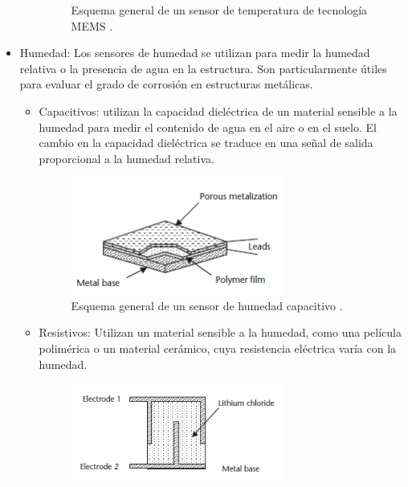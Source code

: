 \begin{itemize}
\begin{itemize}
\begin{figure}[H]
                \caption{Esquema general de un sensor de temperatura de tecnología MEMS \citep{dunn2005introduction}.}
                \label{fig:temp-MEMS}
            \end{figure}
        \end{itemize}

        \item Humedad: Los sensores de humedad se utilizan para medir la humedad relativa o la presencia de agua en la estructura. Son particularmente útiles para evaluar el grado de corrosión en estructuras metálicas.
        \begin{itemize}
            \item Capacitivos: utilizan la capacidad dieléctrica de un material sensible a la humedad para medir el contenido de agua en el aire o en el suelo. El cambio en la capacidad dieléctrica se traduce en una señal de salida proporcional a la humedad relativa.
            \begin{figure}[H]
                \centering
                \includegraphics[width = 0.7\textwidth]{imagenes/cap1_marcoteo/HigrometroCapacitivo.png}
                \caption{Esquema general de un sensor de humedad capacitivo \citep{dunn2005introduction}.}
                \label{fig:hig-cap}
            \end{figure}
            \item Resistivos: Utilizan un material sensible a la humedad, como una película polimérica o un material cerámico, cuya resistencia eléctrica varía con la humedad.
            \begin{figure}[H]
                \centering
                \includegraphics[width = 0.7\textwidth]{imagenes/cap1_marcoteo/HigrometroResistivo.png}

\end{figure}
\end{itemize}
\end{itemize}
